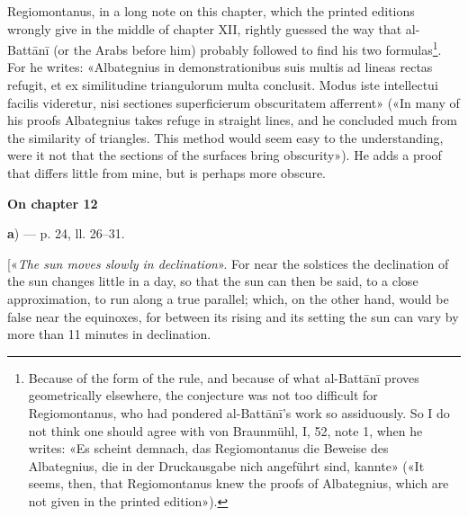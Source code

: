\documentclass[11pt]{article}
\newcommand{\UnitHead}[2]{\par\setcounter{footnoteT}{0}\needspace{8\baselineskip}\bigskip\pdfbookmark[1]{#1}{unit-#2}\hypertarget{EN-#2}{}%
 {\large\bfseries\interlinepenalty=10000 #1\par}\nobreak\medskip}
\begin{document}
\par Regiomontanus, in a long note on this chapter, which the printed editions wrongly give in the middle of chapter XII, rightly guessed the way that al-Battānī (or the Arabs before him) probably followed to find his two formulas\footnote{Because of the form of the rule, and because of what al-Battānī proves geometrically elsewhere, the conjecture was not too difficult for Regiomontanus, who had pondered al-Battānī's work so assiduously. So I do not think one should agree with von Braunmühl, I, 52, note 1, when he writes: «Es scheint demnach, das Regiomontanus die Beweise des Albategnius, die in der Druckausgabe nich angeführt sind, kannte» («It seems, then, that Regiomontanus knew the proofs of Albategnius, which are not given in the printed edition»).}. For he writes: «Albategnius in demonstrationibus suis multis ad lineas rectas refugit, et ex similitudine triangulorum multa conclusit. Modus iste intellectui facilis videretur, nisi sectiones superficierum obscuritatem afferrent» («In many of his proofs Albategnius takes refuge in straight lines, and he concluded much from the similarity of triangles. This method would seem easy to the understanding, were it not that the sections of the surfaces bring obscurity»). He adds a proof that differs little from mine, but is perhaps more obscure.\par
\UnitHead{On chapter 12}{A12}
\par\begin{center}\textbf{a}) — p. 24, ll. 26–31.\end{center}
\par [«\emph{The sun moves slowly in declination}». For near the solstices the declination of the sun changes little in a day, so that the sun can then be said, to a close approximation, to run along a true parallel; which, on the other hand, would be false near the equinoxes, for between its rising and its setting the sun can vary by more than 11 minutes in declination.\par
\begin{center}\end{center}
\end{document}
